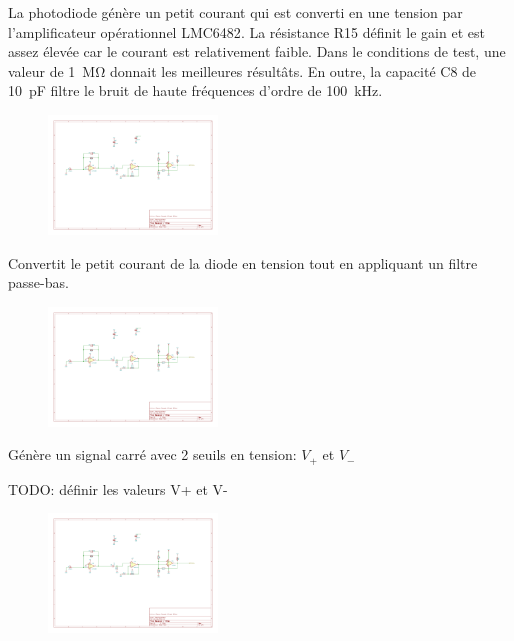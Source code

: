 \documentclass[french]{layout/Report}
\begin{document}
\begin{description}[leftmargin=!,labelwidth=3cm, labelindent=\parindent]
    \item[Convertisseur]
        La photodiode génère un petit courant qui est converti en une tension par l'amplificateur opérationnel LMC6482\cite{LMC6482}.
        La résistance R15 définit le gain et est assez élevée car le courant est relativement faible.
        Dans le conditions de test, une valeur de \SI{1}{\mega\ohm} donnait les meilleures résultâts.
        En outre, la capacité C8 de \SI{10}{\pico\farad} filtre le bruit de haute fréquences d'ordre de \SI{100}{\kilo Hz}.

        \begin{figure}[h]
        \centering
        \includegraphics[width=0.4\textwidth]{fig/current_to_voltage_converter.pdf}
        \end{figure}

    \item[Amplificateur] Convertit le petit courant de la diode en tension tout en appliquant un filtre passe-bas.

        \begin{figure}[h]
        \centering
        \includegraphics[width=0.4\textwidth]{fig/amplifier.pdf}
        \end{figure}

    \item[Schmitt trigger] Génère un signal carré avec 2 seuils en tension: $V_+$ et $V_-$

        TODO: définir les valeurs V+ et V-

        \begin{figure}[h]
        \centering
        \includegraphics[width=0.4\textwidth]{fig/schmitt_trigger.pdf}
        \end{figure}
\end{description}
\end{document}
